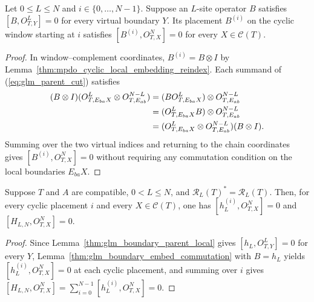 \begin{lemma}
    \label{thm:glm_boundary_embed_commutation}
    \leanok
    Let $0\leq L\leq N$ and $i\in\{0,\ldots,N-1\}$. Suppose an
    $L$-site operator $B$ satisfies $[B,O^L_{T,Y}]=0$ for every virtual
    boundary $Y$. Its placement $B^{(i)}$ on the cyclic window starting
    at $i$ satisfies $[B^{(i)},O^N_{T,X}]=0$ for every
    $X\in\mathcal C(T)$.
\end{lemma}
\begin{proof}
    \leanok
    In window--complement coordinates, $B^{(i)}=B\otimes I$ by
    Lemma~\ref{thm:mpdo_cyclic_local_embedding_reindex}. Each summand
    of (\ref{eq:glm_parent_cut}) satisfies
    \begin{align}
        (B\otimes I)(O^L_{T,E_{ba}X}\otimes O^{N-L}_{T,E_{ab}})
         & =(BO^L_{T,E_{ba}X})\otimes O^{N-L}_{T,E_{ab}} \notag      \\
         & =(O^L_{T,E_{ba}X}B)\otimes O^{N-L}_{T,E_{ab}} \notag      \\
         & =(O^L_{T,E_{ba}X}\otimes O^{N-L}_{T,E_{ab}})(B\otimes I).
        \notag
    \end{align}
    Summing over the two virtual indices and returning to the chain
    coordinates gives $[B^{(i)},O^N_{T,X}]=0$ without requiring any
    commutation condition on the local boundaries $E_{ba}X$.
\end{proof}

\begin{lemma}
    \label{thm:glm_boundary_parent_periodic}
    \leanok
    Suppose $T$ and $A$ are compatible, $0<L\leq N$, and
    $\mathcal R_L(T)^*=\mathcal R_L(T)$. Then, for every cyclic
    placement $i$ and every $X\in\mathcal C(T)$, one has
    $[h_L^{(i)},O^N_{T,X}]=0$ and $[H_{L,N},O^N_{T,X}]=0$.
\end{lemma}
\begin{proof}
    \leanok
    Since Lemma~\ref{thm:glm_boundary_parent_local} gives
    $[h_L,O^L_{T,Y}]=0$ for every $Y$,
    Lemma~\ref{thm:glm_boundary_embed_commutation} with $B=h_L$ yields
    $[h_L^{(i)},O^N_{T,X}]=0$ at each cyclic placement, and summing over $i$
    gives $[H_{L,N},O^N_{T,X}]=\sum_{i=0}^{N-1}[h_L^{(i)},O^N_{T,X}]=0$.
\end{proof}

